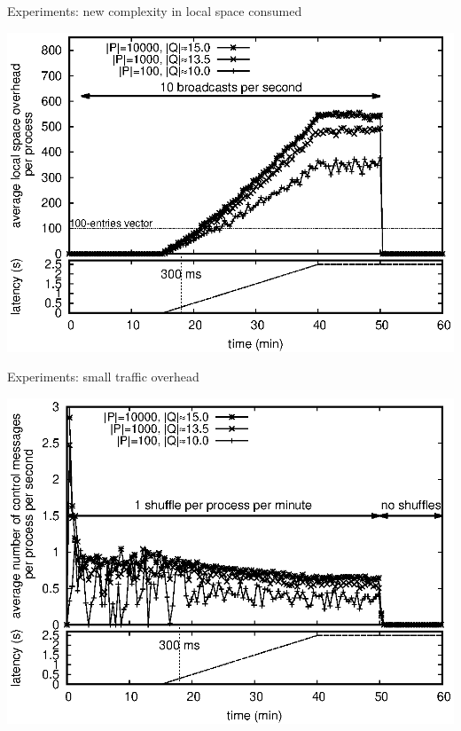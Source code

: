 \documentclass[10pt, xcolor={usenames, dvipsnames}]{beamer}
\begin{document}
\begin{frame}{Experiments: new complexity in local space consumed}

  \hspace{-1em}\includegraphics[width=1.0\textwidth]{img/overhead.eps}

\end{frame}


\begin{frame}{Experiments: small traffic overhead}

  \hspace{-1em}\includegraphics[width=1.0\textwidth]{img/controlmessages.eps}
    
\end{frame}
\end{document}
